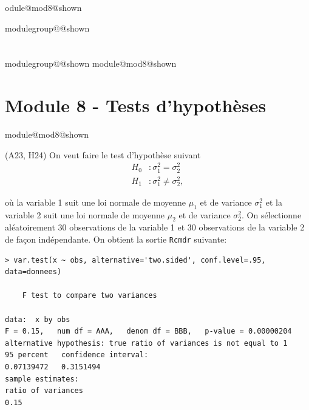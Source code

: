 \documentclass{Evaluation}
\makeatletter
\newcommand{\currentmodulekey}{}
\newcommand{\currentmoduletitle}{}
\newcommand{\currentgroupkey}{}
\newcommand{\currentgrouptitle}{}
\newcommand{\moduleheader}[2]{%
  \renewcommand{\currentmodulekey}{#1}%
  \renewcommand{\currentmoduletitle}{#2}%
  \expandafter\global\expandafter\let\csname module@#1@shown\endcsname\relax
}
\newcommand{\showmoduleifneeded}{%
  \ifx\currentgroupkey\empty\else
    \expandafter\ifx\csname modulegroup@\currentgroupkey @shown\endcsname\relax
      \section*{\currentgrouptitle}%
      \expandafter\gdef\csname modulegroup@\currentgroupkey @shown\endcsname{1}%
    \fi
  \fi
  \expandafter\ifx\csname module@\currentmodulekey @shown\endcsname\relax
    \section*{\currentmoduletitle}%
    \expandafter\gdef\csname module@\currentmodulekey @shown\endcsname{1}%
  \fi
}
\newenvironment{A23}{\showmoduleifneeded}{}
\makeatother
\begin{document}
\begin{questions}
\moduleheader{mod8}{Module 8 - Tests d'hypothèses}

\begin{A23}
\question {}
(A23, H24)
On veut faire le test d'hypothèse suivant
\begin{align*}
H_0 &:\sigma_1^2 = \sigma_2^2\\
H_1 &:\sigma_1^2 \neq \sigma_2^2,
\end{align*}

où la variable 1 suit une loi normale de moyenne $\mu_1$ et de variance $\sigma_1^2$ et la variable 2 suit une loi normale de moyenne $\mu_2$ et de variance $\sigma_2^2$. On sélectionne aléatoirement 30 observations de la variable 1 et 30 observations de la variable 2 de façon indépendante. On obtient la sortie \texttt{Rcmdr} suivante:

\begin{verbatim}
> var.test(x ~ obs, alternative='two.sided', conf.level=.95, data=donnees)

	F test to compare two variances

data:  x by obs
F = 0.15,   num df = AAA,   denom df = BBB,   p-value = 0.00000204
alternative hypothesis: true ratio of variances is not equal to 1
95 percent   confidence interval:
0.07139472   0.3151494
sample estimates:
ratio of variances
0.15
\end{verbatim}

\end{A23}
\end{questions}
\end{document}
